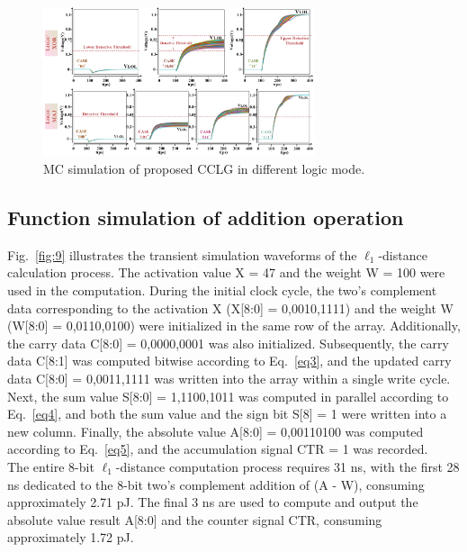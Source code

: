 \documentclass[submit]{elex2024}%
\begin{document}
\begin{figure}[htb]
    \begin{center}
    \includegraphics[width=8cm]{Figures/fig8.pdf}
    \end{center}
    \caption{MC simulation of proposed CCLG in different logic mode.}
    \label{fig:8}
\end{figure}
\subsection{Function simulation of addition operation}

Fig.~\ref{fig:9} illustrates the transient simulation waveforms of the $\ell_1$-distance calculation process. The activation value X = 47 and the weight W = 100 were used in the computation. During the initial clock cycle, the two's complement data corresponding to the activation X (X[8:0] = 0,0010,1111) and the weight W (W[8:0] = 0,0110,0100) were initialized in the same row of the array. Additionally, the carry data C[8:0] = 0,0000,0001 was also initialized. Subsequently, the carry data C[8:1] was computed bitwise according to Eq.~\ref{eq3}, and the updated carry data C[8:0] = 0,0011,1111 was written into the array within a single write cycle. Next, the sum value S[8:0] = 1,1100,1011 was computed in parallel according to Eq.~\ref{eq4}, and both the sum value and the sign bit S[8] = 1 were written into a new column. Finally, the absolute value A[8:0] = 0,00110100 was computed according to Eq.~\ref{eq5}, and the accumulation signal CTR = 1 was recorded. \\
The entire 8-bit $\ell_1$-distance computation process requires 31 ns, with the first 28 ns dedicated to the 8-bit two's complement addition of (A - W), consuming approximately 2.71 pJ. The final 3 ns are used to compute and output the absolute value result A[8:0] and the counter signal CTR, consuming approximately 1.72 pJ.
\end{document}
